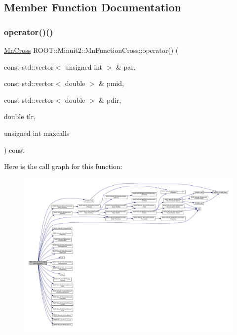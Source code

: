 \subsection{Member Function Documentation}
\mbox{\label{classROOT_1_1Minuit2_1_1MnFunctionCross_ace9b7e1472f82cb23525365e5f061477}} 
\subsubsection{\texorpdfstring{operator()()}{operator()()}\hspace{0.1cm}{\footnotesize\ttfamily [1/2]}}
{\footnotesize\ttfamily \mbox{\hyperlink{classROOT_1_1Minuit2_1_1MnCross}{Mn\+Cross}} R\+O\+O\+T\+::\+Minuit2\+::\+Mn\+Function\+Cross\+::operator() (\begin{DoxyParamCaption}\item[{const std\+::vector$<$ unsigned int $>$ \&}]{par,  }\item[{const std\+::vector$<$ double $>$ \&}]{pmid,  }\item[{const std\+::vector$<$ double $>$ \&}]{pdir,  }\item[{double}]{tlr,  }\item[{unsigned int}]{maxcalls }\end{DoxyParamCaption}) const}

Here is the call graph for this function\+:\nopagebreak
\begin{figure}[H]
\begin{center}
\leavevmode
\includegraphics[width=350pt]{de/d46/classROOT_1_1Minuit2_1_1MnFunctionCross_ace9b7e1472f82cb23525365e5f061477_cgraph}
\end{center}
\end{figure}
\mbox{\label{classROOT_1_1Minuit2_1_1MnFunctionCross_ace9b7e1472f82cb23525365e5f061477}} 
